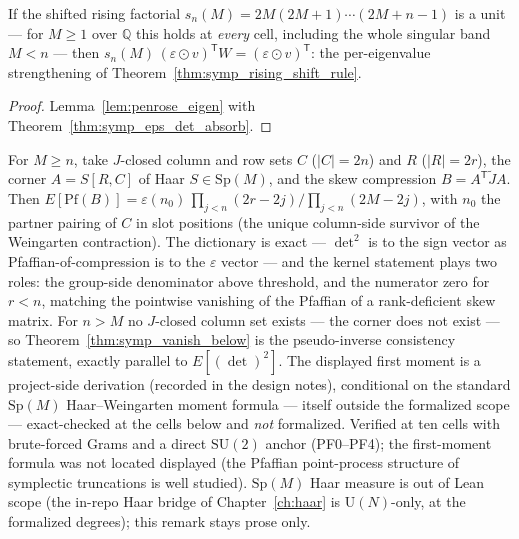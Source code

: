 \begin{theorem}\label{thm:symp_rising_shift_rule_eigen}
\leanok
{}
If the shifted rising factorial $s_n(M)=2M(2M+1)\cdots(2M+n-1)$ is a
unit --- for $M\ge 1$ over $\mathbb Q$ this holds at \emph{every} cell,
including the whole singular band $M<n$ --- then
$s_n(M)\,(\varepsilon\odot v)^{\mathsf T}W
= (\varepsilon\odot v)^{\mathsf T}$: the per-eigenvalue strengthening of
Theorem~\ref{thm:symp_rising_shift_rule}.
\end{theorem}
\begin{proof}
\leanok
{}
Lemma~\ref{lem:penrose_eigen} with
Theorem~\ref{thm:symp_eps_det_absorb}.
\end{proof}

\begin{remark}\label{rem:symp_integral}
For $M\ge n$, take $J$-closed column and row sets $C$ ($|C|=2n$) and $R$
($|R|=2r$), the corner $A = S[R,C]$ of Haar $S\in\mathrm{Sp}(M)$, and the
skew compression $B = A^{\mathsf T}\tilde J A$. Then
$E[\mathrm{Pf}(B)] = \varepsilon(n_0)\,
\prod_{j<n}(2r-2j)\big/\prod_{j<n}(2M-2j)$, with $n_0$ the partner pairing
of $C$ in slot positions (the unique column-side survivor of the Weingarten
contraction). The dictionary is exact ---
$\det^2$ is to the sign vector as Pfaffian-of-compression is to the
$\varepsilon$ vector --- and the kernel statement plays two roles: the
group-side denominator above threshold, and the numerator zero for $r<n$,
matching the pointwise vanishing of the Pfaffian of a rank-deficient skew
matrix. For $n>M$ no $J$-closed column set exists --- the corner does not
exist --- so Theorem~\ref{thm:symp_vanish_below} is the pseudo-inverse
consistency statement, exactly parallel to $E[(\det)^2]$. The displayed
first moment is a project-side derivation (recorded in the design notes),
conditional on the standard $\mathrm{Sp}(M)$ Haar--Weingarten moment
formula --- itself outside the formalized scope --- exact-checked at the
cells below and \emph{not} formalized. Verified at ten
cells with brute-forced Grams and a direct $\mathrm{SU}(2)$ anchor
(PF0--PF4); the first-moment formula was not located displayed (the
Pfaffian point-process structure of symplectic truncations is well
studied). $\mathrm{Sp}(M)$ Haar measure is out of Lean scope (the in-repo Haar
bridge of Chapter~\ref{ch:haar} is $\mathrm U(N)$-only, at the formalized
degrees); this remark stays prose only.
\end{remark}

